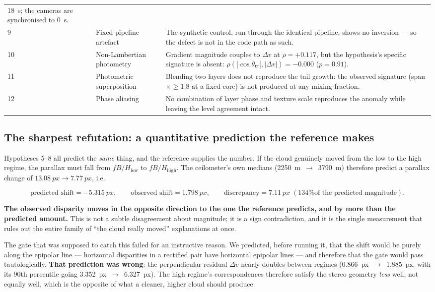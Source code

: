\documentclass[11pt,a4paper]{article}
\newcommand{\rhoS}{\ensuremath{\rho}}
\begin{document}
\begin{table}[t]
\begin{tabular}{@{}p{}p{}p{}@{}}
  \SI{18}{\second}; the cameras are synchronised to \SI{0}{\second}. \\
9 & Fixed pipeline artefact & The synthetic control, run through the identical pipeline, shows
  no inversion --- so the defect is not in the code path as such. \\
10 & Non-Lambertian photometry & Gradient magnitude couples to $\Delta v$ at
  $\rhoS = +0.117$, but the hypothesis's specific signature is absent:
  $\rhoS(|\cos\theta_{\nabla}|,|\Delta v|) = -0.000$ ($p=0.91$). \\
11 & Photometric superposition & Blending two layers does not reproduce the tail growth: the
  observed signature (span $\times\ge 1.8$ at a fixed core) is not produced at any mixing
  fraction. \\
12 & Phase aliasing & No combination of layer phase and texture scale reproduces the anomaly
  while leaving the level agreement intact. \\
\bottomrule
\end{tabular}
\end{table}


\subsection*{The sharpest refutation: a quantitative prediction the reference makes}

Hypotheses 5--8 all predict the \emph{same} thing, and the reference supplies the number. If
the cloud genuinely moved from the low to the high regime, the parallax must fall from
$f B/H_{\text{low}}$ to $f B/H_{\text{high}}$. The ceilometer's own medians
(\SI{2250}{\metre}~$\to$~\SI{3790}{\metre}) therefore predict a parallax change of
$\SI{13.08}{px} \to \SI{7.77}{px}$, i.e.

\begin{equation}
\text{predicted shift} = \SI{-5.315}{px},
\qquad
\text{observed shift} = \SI{+1.798}{px},
\qquad
\text{discrepancy} = \SI{+7.11}{px} \;(\text{134\% of the predicted magnitude}).
\end{equation}

\noindent
\textbf{The observed disparity moves in the opposite direction to the one the reference
predicts, and by more than the predicted amount.} This is not a subtle disagreement about
magnitude; it is a sign contradiction, and it is the single measurement that rules out the
entire family of ``the cloud really moved'' explanations at once.

The gate that was supposed to catch this failed for an instructive reason. We predicted, before
running it, that the shift would be purely along the epipolar line --- horizontal disparities
in a rectified pair have horizontal epipolar lines --- and therefore that the gate would pass
tautologically. \textbf{That prediction was wrong}: the perpendicular residual $\Delta v$
nearly doubles between regimes (\SI{0.866}{px}~$\to$~\SI{1.885}{px}, with its 90th percentile
going \SI{3.352}{px}~$\to$~\SI{6.327}{px}). The high regime's correspondences therefore satisfy
the stereo geometry \emph{less} well, not equally well, which is the opposite of what a
cleaner, higher cloud should produce.
\end{document}
